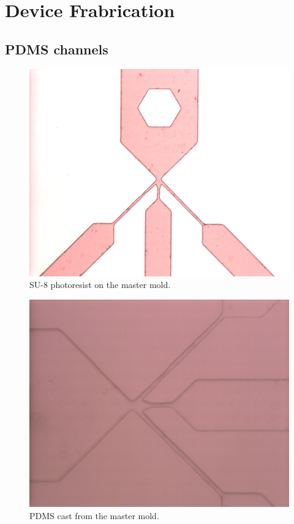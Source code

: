 
\section{Device Frabrication}

\subsection{PDMS channels}

\begin{figure}[h]
    \centering
    \includegraphics[width=\textwidth]{images/su8_results.png}
    \caption{SU-8 photoresist on the master mold.}
    \label{fig:su8_results}
\end{figure}

\begin{figure}[h]
    \centering
    \includegraphics[width=\textwidth]{images/PDMS_channels.png}
    \caption{PDMS cast from the master mold.}
    \label{fig:pdms_results}
\end{figure}

